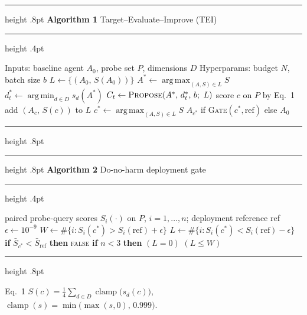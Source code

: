 \documentclass[10pt,border=6pt]{standalone}
\newlength{\algwidth}\setlength{\algwidth}{6.5in}
\newlength{\boxA}\setlength{\boxA}{3.60in}
\newlength{\boxB}\setlength{\boxB}{2.78in}
\begin{document}
\begin{minipage}{\algwidth}

\begin{minipage}[t]{\boxA}
\hrule height .8pt \vspace{2pt}
{\small\textbf{Algorithm 1} Target--Evaluate--Improve (TEI)}
\vspace{2pt} \hrule height .4pt \vspace{3pt}
\begin{algorithmic}[1]
\Require Inputs: baseline agent $A_0$, probe set $P$, dimensions $D$
\Require Hyperparams: budget $N$, batch size $b$
\State $L\gets\{(A_0,\,S(A_0))\}$
  \State $A^{\ast}\gets \operatorname*{arg\,max}_{(A,S)\in L} S$
  \State $d^{\ast}_t\gets \operatorname*{arg\,min}_{d\in D} s_d(A^{\ast})$
  \State $C_t\gets \textsc{Propose}(A^{\ast},\,d^{\ast}_t,\,b;\ L)$
      \State score $c$ on $P$ by Eq.~1 
      \State add $(A_c,\,S(c))$ to $L$
    \EndIf
  \EndFor
\EndFor
\State $c^{\ast}\gets \operatorname*{arg\,max}_{(A,S)\in L} S$
\State \Return $A_{c^{\ast}}$ if \textsc{Gate}$(c^{\ast},\mathrm{ref})$ else $A_0$
\end{algorithmic}
\vspace{1pt}\hrule height .8pt
\end{minipage}
\hfill
\begin{minipage}[t]{\boxB}
\hrule height .8pt \vspace{2pt}
{\small\textbf{Algorithm 2} Do-no-harm deployment gate}
\vspace{2pt} \hrule height .4pt \vspace{3pt}
\begin{algorithmic}[1]
\Require paired probe-query scores $S_i(\cdot)$ on $P$, $i=1,\dots,n$;
         deployment reference ref
  \State $\epsilon\gets 10^{-9}$
  \State $W\gets\#\{i: S_i(c^{\ast})>S_i(\mathrm{ref})+\epsilon\}$
  \State $L\gets\#\{i: S_i(c^{\ast})<S_i(\mathrm{ref})-\epsilon\}$
  \State \textbf{if} $\bar S_{c^{\ast}}<\bar S_{\mathrm{ref}}$ \textbf{then}
         \Return \textsc{false}
  \State \textbf{if} $n<3$ \textbf{then} \Return $(L=0)$
  \State \Return $(L\le W)$
\EndFunction
\end{algorithmic}
\vspace{1pt}\hrule height .8pt
\end{minipage}

\vspace{5pt}
{\footnotesize\noindent Eq.~1\quad
$S(c)=\tfrac{1}{4}\sum_{d\in D}\operatorname{clamp}\!\big(s_d(c)\big)$,\qquad
$\operatorname{clamp}(s)=\min\!\big(\max(s,0),\,0.999\big)$.\par}
\end{minipage}
\end{document}
